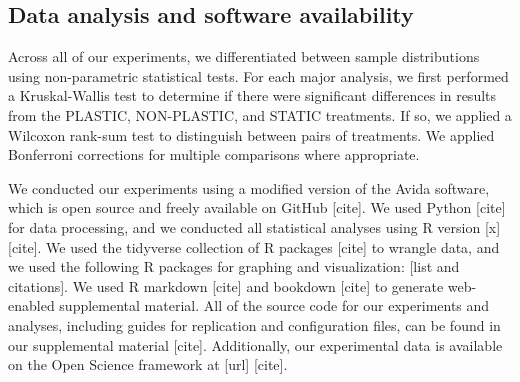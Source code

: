 \subsection{Data analysis and software availability}

Across all of our experiments, we differentiated between sample distributions using non-parametric statistical tests.
For each major analysis, we first performed a Kruskal-Wallis test \citep{kruskal_use_1952} to 
determine if there were significant differences in results from the PLASTIC, NON-PLASTIC, and STATIC treatments.
If so, we applied a Wilcoxon rank-sum test \citep{kotz_individual_1992} to distinguish between pairs of treatments.
We applied Bonferroni corrections for multiple comparisons \citep{rice_analyzing_1989} where appropriate.

We conducted our experiments using a modified version of the Avida software, which is open source and freely available on GitHub [cite].
We used Python [cite] for data processing, and we conducted all statistical analyses using R version [x] [cite].
We used the tidyverse collection of R packages [cite] to wrangle data, and we used the following R packages for graphing and visualization: [list and citations].
We used R markdown [cite] and bookdown [cite] to generate web-enabled supplemental material.
All of the source code for our experiments and analyses, including guides for replication and configuration files, can be found in our supplemental material [cite].
Additionally, our experimental data is available on the Open Science framework at [url] [cite].